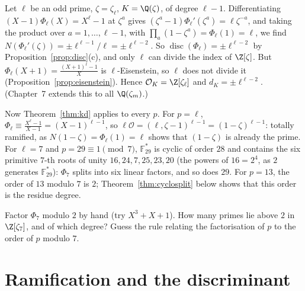 \begin{example}\label{exa:zetap}
Let $\ell$ be an odd prime, $\zeta=\zeta_\ell$, $K=\Q(\zeta)$, of degree $\ell-1$. Differentiating $(X-1)\Phi_\ell(X)=
X^\ell-1$ at $\zeta^a$ gives $(\zeta^a-1)\Phi_\ell'(\zeta^a)=\ell\zeta^{-a}$, and taking the product over $a=1,\dots,\ell-1$,
with $\prod_a(1-\zeta^a)=\Phi_\ell(1)=\ell$, we find $N(\Phi_\ell'(\zeta))=\pm\ell^{\ell-1}/\ell=\pm\ell^{\ell-2}$. So
$\operatorname{disc}(\Phi_\ell)=\pm\ell^{\ell-2}$ by Proposition~\ref{prop:disc}(c), and only $\ell$ can divide the index
of $\Z[\zeta]$. But $\Phi_\ell(X+1)=\frac{(X+1)^\ell-1}X$ is $\ell$-Eisenstein, so $\ell$ does not divide it
(Proposition~\ref{prop:eisenstein}). Hence $\mathcal O_K=\Z[\zeta_\ell]$ and $d_K=\pm\ell^{\ell-2}$. (Chapter~7 extends this
to all $\Q(\zeta_m)$.)

Now Theorem~\ref{thm:kd} applies to every $p$. For $p=\ell$, $\Phi_\ell\equiv\frac{X^\ell-1}{X-1}=(X-1)^{\ell-1}$, so
$\ell\mathcal O=(\ell,\zeta-1)^{\ell-1}=(1-\zeta)^{\ell-1}$: totally ramified, as $N(1-\zeta)=\Phi_\ell(1)=\ell$ shows that
$(1-\zeta)$ is already the prime. For $\ell=7$ and $p=29\equiv1\pmod7$, $\mathbb F_{29}^*$ is cyclic of order $28$ and
contains the six primitive $7$-th roots of unity $16,24,7,25,23,20$ (the powers of $16=2^{4}$, as $2$ generates
$\mathbb F_{29}^*$): $\Phi_7$ splits into six linear factors, and so does $29$. For $p=13$, the order of $13$ modulo $7$ is
$2$; Theorem~\ref{thm:cyclosplit} below shows that this order is the residue degree.
\end{example}

\begin{think}
Factor $\Phi_7$ modulo $2$ by hand (try $X^3+X+1$). How many primes lie above $2$ in $\Z[\zeta_7]$, and of which degree?
Guess the rule relating the factorisation of $p$ to the order of $p$ modulo $7$.
\end{think}

\section{Ramification and the discriminant}


